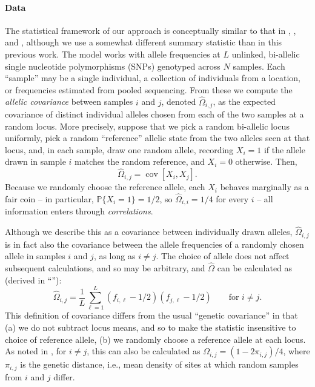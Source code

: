 \documentclass[10pt,letterpaper]{article}
\newcommand{\secref}[1]{``\nameref{#1}''}
\renewcommand{\P}{\mathbb{P}}
\newcommand{\cov}{\mathop{\mbox{cov}}}
\begin{document}
\paragraph{Data}
The statistical framework of our approach is conceptually similar to that in \cite{Wasser2004}, \cite{BEDASSLE}, and \cite{spacemix},
although we use a somewhat different summary statistic than in this previous work.
The model works with allele frequencies at $L$ unlinked, bi-allelic single nucleotide polymorphisms (SNPs) genotyped across $N$ samples.
Each ``sample'' may be a single individual,  
a collection of individuals from a location, 
or frequencies estimated from pooled sequencing.
From these we compute the \emph{allelic covariance} 
between samples $i$ and $j$, denoted $\widehat{\Omega}_{i,j}$,
as the expected covariance of distinct individual alleles 
chosen from each of the two samples at a random locus.
More precisely, suppose that we pick a random bi-allelic locus uniformly,
pick a random ``reference'' allelic state from the two alleles seen at that locus,
and, in each sample, draw one random allele,
recording $X_i = 1$ if the allele drawn in sample $i$ matches the random reference,
and $X_i = 0$ otherwise.
Then, 
\begin{equation} \label{eqn:first_allelic_cov}
    \widehat{\Omega}_{i,j} = \cov[X_i, X_j] .
\end{equation}
Because we randomly choose the reference allele, 
each $X_i$ behaves marginally as a fair coin --
in particular, $\P\{X_i = 1\} = 1/2$, so $\widehat{\Omega}_{i,i} = 1/4$ for every $i$ --
all information enters through \emph{correlations}.


Although we describe this as a covariance between individually drawn alleles,
$\widehat{\Omega}_{i,j}$ is in fact also the covariance between the allele frequencies
of a randomly chosen allele in samples $i$ and $j$, as long as $i \neq j$.
The choice of allele does not affect subsequent calculations, and so may be arbitrary, 
and $\widehat \Omega$ can be calculated as 
(derived in \secref{allelic_cov}):
\begin{equation}
\widehat{\Omega}_{i,j} = 
    \frac{1}{L} \sum_{\ell=1}^L (f_{i,\ell}-1/2) (f_{j,\ell}-1/2) \qquad \text{for } i \neq j.
\label{allelic_covariance}
\end{equation}
This definition of covariance differs from the usual ``genetic covariance'' \cite{mcvean_genealogical_2009}
in that (a) we do not subtract locus means,
and so to make the statistic insensitive to choice of reference allele, 
(b) we randomly choose a reference allele at each locus.
As noted in \cite{EEMS}, for $i \neq j$,
this can also be calculated as $\Omega_{i,j} = (1 - 2 \pi_{i,j})/4$,
where $\pi_{i,j}$ is the genetic distance,
i.e., mean density of sites at which random samples from $i$ and $j$ differ.
\end{document}

